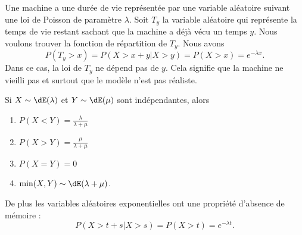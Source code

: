 \begin{example}
    Une machine a une durée de vie représentée par une variable aléatoire suivant une loi de Poisson de paramètre \( \lambda\). Soit \( T_y\) la variable aléatoire qui représente la temps de vie restant sachant que la machine a déjà vécu un temps \( y\). Nous voulons trouver la fonction de répartition de \( T_y\). Nous avons
    \begin{equation}
        P(T_y>x)=P(X>x+y|X>y)=P(X>x)= e^{-\lambda x}.
    \end{equation}
    Dans ce cas, la loi de \( T_y\) ne dépend pas de \( y\). Cela signifie que la machine ne vieilli pas et surtout que le modèle n'est pas réaliste.
\end{example}

\begin{proposition}
    Si \( X\sim\dE(\lambda)\) et \( Y\sim\dE(\mu)\) sont indépendantes, alors
    \begin{enumerate}
        \item
            \( P(X<Y)=\frac{ \lambda }{ \lambda+\mu }\)
        \item
            \( P(X>Y)=\frac{ \mu }{ \lambda+\mu }\)
        \item
            \( P(X=Y)=0\)
        \item
            \( \min(X,Y)\sim\dE(\lambda+\mu)\).
    \end{enumerate}
    De plus les variables aléatoires exponentielles ont une propriété d'absence de mémoire :
    \begin{equation}
        P(X>t+s|X>s)=P(X>t)= e^{-\lambda t}.
    \end{equation}
\end{proposition}

